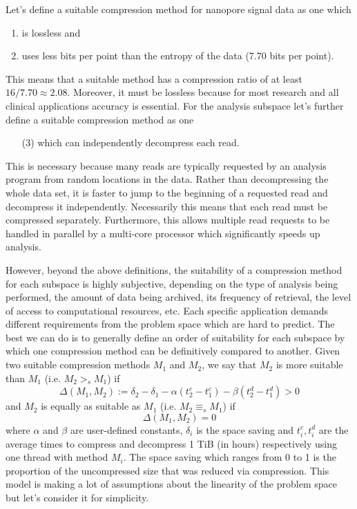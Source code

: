Let's define a suitable compression method for nanopore signal data as
one which
\begin{enumerate}
	\item is lossless and
	\item uses less bits per point than the entropy of the data (7.70 bits per point).
\end{enumerate}
This means that a suitable method has a compression ratio of at least $16/7.70 \approx 2.08$.
Moreover, it must be lossless because for most research and all clinical
applications accuracy is essential. For
the analysis subspace let's further define a suitable compression method as one
\begin{enumerate}
	\item[(3)] which can independently decompress each read.
\end{enumerate}
This is necessary because many
reads are typically requested by an analysis program from random locations in
the data. Rather than decompressing the whole data set, it is faster to jump to
the beginning of a requested read and decompress it independently.
Necessarily this means that each read must be compressed separately.
Furthermore, this allows multiple read requests to be handled in parallel by a
multi-core processor which significantly speeds up analysis.

However, beyond the above definitions, the suitability of a compression method
for each subspace is highly subjective, depending on the type of analysis being
performed, the amount of data being archived, its frequency of retrieval, the
level of access to computational resources, etc. Each specific application
demands different requirements from the problem space which are hard to predict.
The best we can do is to generally define an order of suitability for each
subspace by which one compression method can be definitively compared to
another. Given two suitable compression methods $M_1$ and $M_2$, we say that
$M_2$ is more suitable than $M_1$ (i.e. $M_2>_sM_1$) if
\[\Delta(M_1,M_2):=\delta_2-\delta_1 - \alpha(t^c_2-t^c_1) - \beta(t^d_2-t^d_1) > 0\]
and $M_2$ is equally as suitable as $M_1$ (i.e. $M_2\equiv_sM_1$) if
\[\Delta(M_1,M_2)= 0\]
where $\alpha$ and $\beta$ are user-defined constants, $\delta_i$ is the
space saving and $t^c_i,t^d_i$ are the average times to
compress and decompress 1 TiB (in hours) respectively using one thread with
method $M_i$. The space saving which ranges from 0 to 1 is the proportion of
the uncompressed size that was reduced via compression. This model is making a
lot of assumptions about the linearity of the problem space but let's consider
it for simplicity.

